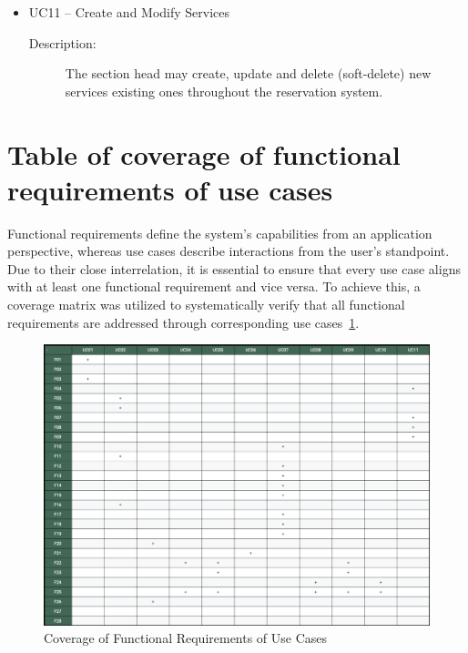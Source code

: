 \begin{itemize}
\item UC11 -- Create and Modify Services

\begin{description}
\item [Description:] The section head may create, update and delete (soft-delete) new services existing ones throughout the reservation system.
\end{description}

\end{itemize}

\section{Table of coverage of functional requirements of use cases}

Functional requirements define the system’s capabilities from an application perspective, whereas use cases describe interactions from the user’s standpoint. Due to their close interrelation, it is essential to ensure that every use case aligns with at least one functional requirement and vice versa. To achieve this, a coverage matrix was utilized to systematically verify that all functional requirements are addressed through corresponding use cases~\ref{fig:coverage table}.

\begin{figure}[H]
  \centering
  \includegraphics[width=\linewidth]{images/coverage-table}
  \caption{Coverage of Functional Requirements of Use Cases}
  \label{fig:coverage table}
\end{figure}


